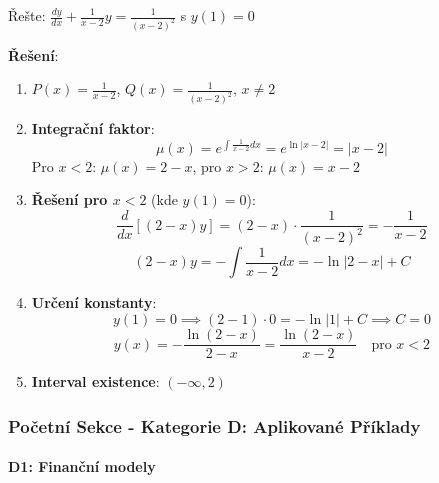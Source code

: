 \begin{example}
Řešte: $\frac{dy}{dx} + \frac{1}{x-2}y = \frac{1}{(x-2)^2}$ s $y(1) = 0$
\vspace{0.3\baselineskip}

\textbf{Řešení}: 
\begin{enumerate}
\item $P(x) = \frac{1}{x-2}$, $Q(x) = \frac{1}{(x-2)^2}$, $x \neq 2$

\item \textbf{Integrační faktor}:
\[
\mu(x) = e^{\int \frac{1}{x-2}dx} = e^{\ln|x-2|} = |x-2|
\]
Pro $x < 2$: $\mu(x) = 2-x$, pro $x > 2$: $\mu(x) = x-2$

\item \textbf{Řešení pro $x < 2$} (kde $y(1) = 0$):
\[
\frac{d}{dx}[(2-x)y] = (2-x)\cdot\frac{1}{(x-2)^2} = -\frac{1}{x-2}
\]
\[
(2-x)y = -\int \frac{1}{x-2}dx = -\ln|2-x| + C
\]

\item \textbf{Určení konstanty}:
\[
y(1) = 0 \implies (2-1)\cdot 0 = -\ln|1| + C \implies C = 0
\]
\[
y(x) = -\frac{\ln(2-x)}{2-x} = \frac{\ln(2-x)}{x-2} \quad \text{pro } x < 2
\]

\item \textbf{Interval existence}: $(-\infty, 2)$
\end{enumerate}
\end{example}

\vspace{0.8\baselineskip}

\subsubsection{Početní Sekce - Kategorie D: Aplikované Příklady}
\label{subsubsec:pocetni-kategorie-d-linear}

\paragraph*{D1: Finanční modely}

